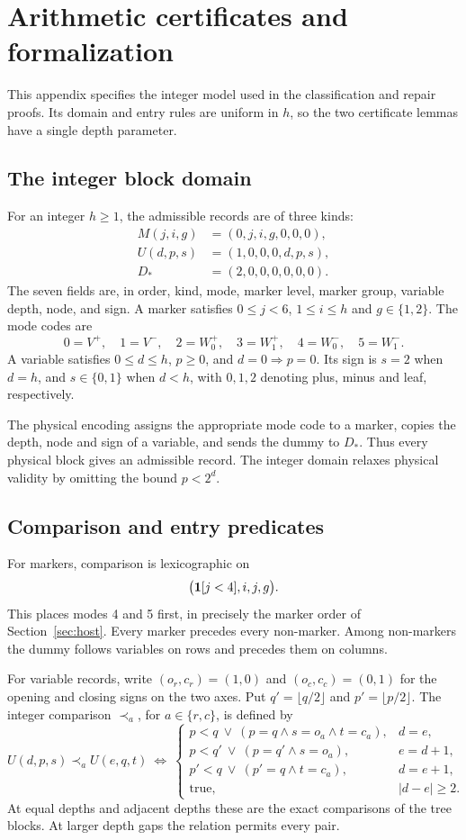 \section{Arithmetic certificates and formalization}\label{app:formalization}
This appendix specifies the integer model used in the classification and
repair proofs. Its domain and entry rules are uniform in $h$, so the two
certificate lemmas have a single depth parameter.

\subsection{The integer block domain}\label{app:integer}
For an integer $h\ge1$, the admissible records are of three kinds:
\begin{align*}
 M(j,i,g)&=(0,j,i,g,0,0,0),\\
 U(d,p,s)&=(1,0,0,0,d,p,s),\\
 D_*&=(2,0,0,0,0,0,0).
\end{align*}
The seven fields are, in order, kind, mode, marker level, marker group,
variable depth, node, and sign. A marker satisfies
$0\le j<6$, $1\le i\le h$ and $g\in\{1,2\}$. The mode codes are
\[
 0=V^+,\quad 1=V^-,\quad 2=W_0^+,\quad 3=W_1^+,
 \quad 4=W_0^-,\quad 5=W_1^-.
\]
A variable satisfies $0\le d\le h$, $p\ge0$, and $d=0\Rightarrow p=0$.
Its sign is $s=2$ when $d=h$, and $s\in\{0,1\}$ when $d<h$, with
$0,1,2$ denoting plus, minus and leaf, respectively.

The physical encoding assigns the appropriate mode code to a marker,
copies the depth, node and sign of a variable, and sends the dummy to
$D_*$. Thus every physical block gives an admissible record. The integer
domain relaxes physical validity by omitting the bound $p<2^d$.

\subsection{Comparison and entry predicates}
For markers, comparison is lexicographic on
\[
 \bigl(\mathbf1[j<4],i,j,g\bigr).
\]
This places modes 4 and 5 first, in precisely the marker order of
Section~\ref{sec:host}. Every marker precedes every non-marker. Among
non-markers the dummy follows variables on rows and precedes them on
columns.

For variable records, write $(o_r,c_r)=(1,0)$ and
$(o_c,c_c)=(0,1)$ for the opening and closing signs on the two axes.
Put $q'=\lfloor q/2\rfloor$ and $p'=\lfloor p/2\rfloor$. The integer
comparison $\prec_a$, for $a\in\{r,c\}$, is defined by
\begin{equation}\label{eq:integer-order}
 U(d,p,s)\prec_a U(e,q,t)\ \Longleftrightarrow\
 \begin{cases}
 p<q\ \lor\ (p=q\land s=o_a\land t=c_a),&d=e,\\
 p<q'\ \lor\ (p=q'\land s=o_a),&e=d+1,\\
 p'<q\ \lor\ (p'=q\land t=c_a),&d=e+1,\\
 \mathrm{true},&|d-e|\ge2.
 \end{cases}
\end{equation}
At equal depths and adjacent depths these are the exact comparisons of
the tree blocks. At larger depth gaps the relation permits every pair.

